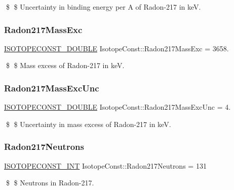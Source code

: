 \$ \$ Uncertainty in binding energy per A of Radon-\/217 in keV. \mbox{\label{group___isotope_const-_radon-_rn217_ga90bbb422bd7c6ce22baed317e89ea071}} 
\subsubsection{\texorpdfstring{Radon217\+Mass\+Exc}{Radon217MassExc}}
{\footnotesize\ttfamily \mbox{\hyperlink{group___isotope_const-_macros_ga8f45a7272ce02c0b4c65c44636ed719a}{I\+S\+O\+T\+O\+P\+E\+C\+O\+N\+S\+T\+\_\+\+D\+O\+U\+B\+LE}} Isotope\+Const\+::\+Radon217\+Mass\+Exc = 3658.}

\$ \$ Mass excess of Radon-\/217 in keV. \mbox{\label{group___isotope_const-_radon-_rn217_ga84bf0dd699489b8e01f370e1e3010f4c}} 
\subsubsection{\texorpdfstring{Radon217\+Mass\+Exc\+Unc}{Radon217MassExcUnc}}
{\footnotesize\ttfamily \mbox{\hyperlink{group___isotope_const-_macros_ga8f45a7272ce02c0b4c65c44636ed719a}{I\+S\+O\+T\+O\+P\+E\+C\+O\+N\+S\+T\+\_\+\+D\+O\+U\+B\+LE}} Isotope\+Const\+::\+Radon217\+Mass\+Exc\+Unc = 4.}

\$ \$ Uncertainty in mass excess of Radon-\/217 in keV. \mbox{\label{group___isotope_const-_radon-_rn217_ga33720690012084f10b9fd8ee3747702c}} 
\subsubsection{\texorpdfstring{Radon217\+Neutrons}{Radon217Neutrons}}
{\footnotesize\ttfamily \mbox{\hyperlink{group___isotope_const-_macros_ga5f18360b3e99483a35c32d789e62621c}{I\+S\+O\+T\+O\+P\+E\+C\+O\+N\+S\+T\+\_\+\+I\+NT}} Isotope\+Const\+::\+Radon217\+Neutrons = 131}

\$ \$ Neutrons in Radon-\/217. \mbox{\label{group___isotope_const-_radon-_rn217_ga5e4c9bdca13b959870d5fe44dda83c33}} 
